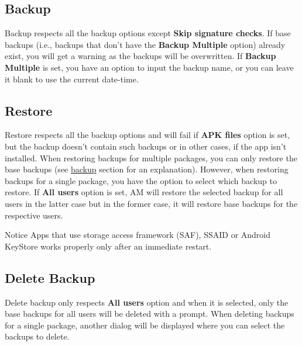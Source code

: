 \subsection{Backup}\label{subsec:backup-restore-backup}
Backup respects all the backup options except \textbf{Skip signature checks}.
If base backups (i.e., backups that don't have the \textbf{Backup Multiple} option) already exist, you will get a warning as the backups will be overwritten.
If \textbf{Backup Multiple} is set, you have an option to input the backup name, or you can leave it blank to use the current date-time.

\subsection{Restore}\label{subsec:backup-restore-restore}
Restore respects all the backup options and will fail if \textbf{APK files} option is set, but the backup doesn't
contain such backups or in other cases, if the app isn't installed.
When restoring backups for multiple packages, you can only restore the base backups (see \hyperref[subsec:backup-restore-backup]{backup} section for an explanation).
However, when restoring backups for a single package, you have the option to select which backup to restore.
If \textbf{All users} option is set, AM will restore the selected backup for all users in the latter case but in the former case, it will restore base backups for the respective users.

\begin{tip}{Notice}
    Apps that use storage access framework (SAF), SSAID or Android KeyStore works properly only after an immediate restart.
\end{tip}

\subsection{Delete Backup}\label{subsec:backup-restore-delete-backup}
Delete backup only respects \textbf{All users} option and when it is selected, only the base backups for all users will be deleted with a prompt.
When deleting backups for a single package, another dialog will be displayed where you can select the backups to delete.
